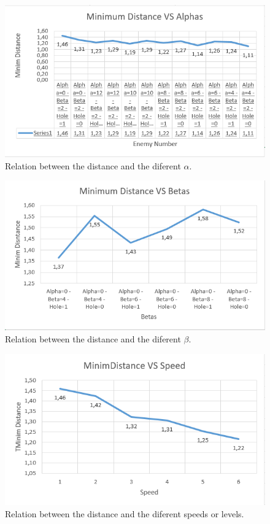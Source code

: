 \begin{figure}[ht]
  \centering
    \includegraphics[width=\linewidth]{Figures/GraphDistanceVSAlpha.png}
    \caption{Relation between the distance and the diferent $\alpha$.}
  \label{fig:example}
\end{figure}

\begin{figure}[ht]
  \centering
    \includegraphics[width=\linewidth]{Figures/GraphDistanceVSBeta.png}
    \caption{Relation between the distance and the diferent $\beta$.}
  \label{fig:example}
\end{figure}

\begin{figure}[ht]
  \centering
    \includegraphics[width=\linewidth]{Figures/GraphDistanceVSSpeed.png}
    \caption{Relation between the distance and the diferent speeds or levels.}
  \label{fig:example}
\end{figure}

